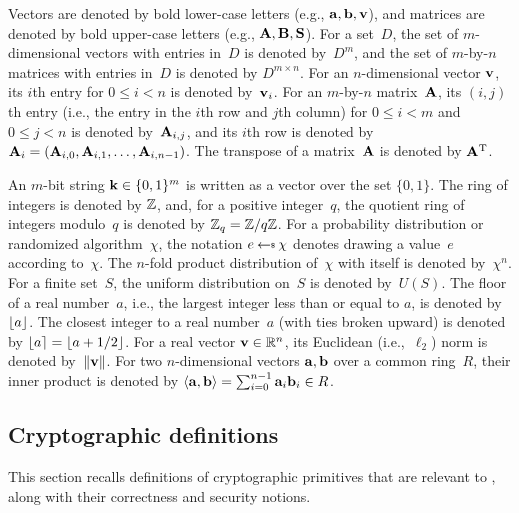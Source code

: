 \else

Vectors are denoted by bold lower-case letters (e.g., $\mathbf{a}, \mathbf{b}, \mathbf{v}$),
and matrices are denoted by bold upper-case letters (e.g., $\mathbf{A}, \mathbf{B}, \mathbf{S}$).
For a set~$D$, the set of $m$-dimensional vectors with entries in~$D$ is denoted by~$D^{m}$,
and the set of $m$-by-$n$ matrices with entries in~$D$ is denoted by $D^{m \times n}$.
For an $n$-dimensional vector $\mathbf{v}$, its $i$th entry for $0\leq i < n$ is denoted by~$\mathbf{v}_i$.
For an $m$-by-$n$ matrix~$\mathbf{A}$, its $(i,j)$th entry (i.e., the entry in the $i$th row and $j$th
column) for $0 \leq i <m$ and $0 \leq j < n$ is denoted by~$\mathbf{A}_{i,j}$, and its $i$th row is
denoted by~$\mathbf{A}_i = (\mathbf{A}_{i,0},\mathbf{A}_{i,1},\ldots,\mathbf{A}_{i,n-1})$.
The transpose of a matrix~$\mathbf{A}$ is denoted by $\mathbf{A}^\text{T}$.  

An $m$-bit string $\mathbf{k}\in \{0,1\}^m$ is written as a vector over the set $\{0,1\}$.
The ring of integers is denoted by $\mathbb{Z}$, and, for a positive integer~$q$, the quotient ring
of integers modulo~$q$ is denoted by $\mathbb{Z}_q = \mathbb{Z}/q\mathbb{Z}$.
For a probability distribution or randomized algorithm~$\chi$, the notation $e \getsr \chi$ denotes drawing a value~$e$
according to~$\chi$.
The $n$-fold product distribution of~$\chi$ with itself is denoted by~$\chi^{n}$.
For a finite set~$S$, the uniform distribution on~$S$ is denoted by~$U(S)$.
The floor of a real number~$a$, i.e., the largest integer less than or equal to $a$,
is denoted by~$\lfloor a\rfloor$.
The closest integer to a real number~$a$ (with ties broken upward) is denoted by
$\lfloor a\rceil = \lfloor a+1/2\rfloor$.
For a real vector $\mathbf{v}\in \mathbb{R}^n$, its Euclidean (i.e.,~$\ell_{2}$) norm is denoted
by~$\lVert\mathbf{v}\rVert$.
For two $n$-dimensional vectors $\mathbf{a}, \mathbf{b}$ over a common ring~$R$, their inner product
is denoted by $\langle\mathbf{a}, \mathbf{b}\rangle = \sum_{i=0}^{n-1} \mathbf{a}_{i} \mathbf{b}_{i} \in R$.

\fi

\subsection{Cryptographic definitions}%
\label{sec:background:crypto}

This section recalls definitions of cryptographic primitives that are relevant to \FrodoKEM, along with their correctness and security notions.

